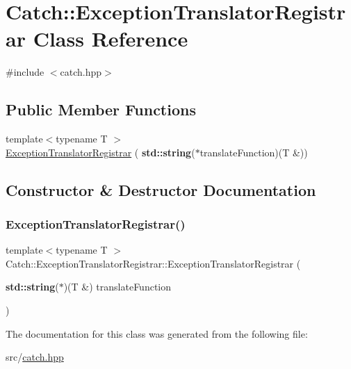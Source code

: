\hypertarget{class_catch_1_1_exception_translator_registrar}{}\section{Catch\+:\+:Exception\+Translator\+Registrar Class Reference}
\label{class_catch_1_1_exception_translator_registrar}


{\ttfamily \#include $<$catch.\+hpp$>$}

\subsection*{Public Member Functions}
\begin{DoxyCompactItemize}
\item 
{\footnotesize template$<$typename T $>$ }\\\hyperlink{class_catch_1_1_exception_translator_registrar_aa73229de911f26b1df6c6c87c4d9e04e}{Exception\+Translator\+Registrar} (\textbf{ std\+::string}($\ast$translate\+Function)(T \&))
\end{DoxyCompactItemize}


\subsection{Constructor \& Destructor Documentation}
\mbox{\label{class_catch_1_1_exception_translator_registrar_aa73229de911f26b1df6c6c87c4d9e04e}} 
\subsubsection{\texorpdfstring{Exception\+Translator\+Registrar()}{ExceptionTranslatorRegistrar()}}
{\footnotesize\ttfamily template$<$typename T $>$ \\
Catch\+::\+Exception\+Translator\+Registrar\+::\+Exception\+Translator\+Registrar (\begin{DoxyParamCaption}\item[{\textbf{ std\+::string}($\ast$)(T \&)}]{translate\+Function }\end{DoxyParamCaption})\hspace{0.3cm}{\ttfamily [inline]}}



The documentation for this class was generated from the following file\+:\begin{DoxyCompactItemize}
\item 
src/\hyperlink{catch_8hpp}{catch.\+hpp}\end{DoxyCompactItemize}
